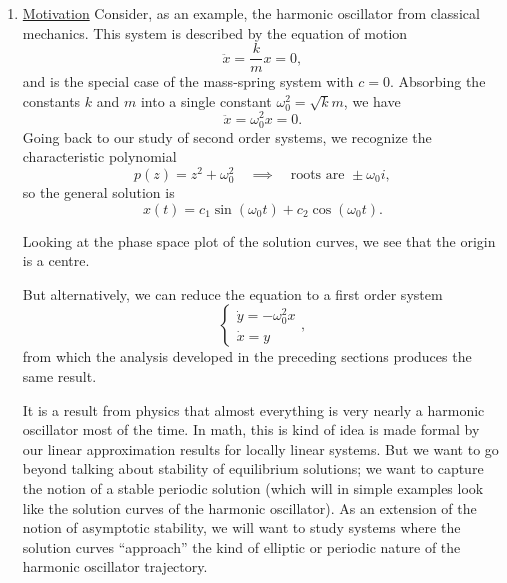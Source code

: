 \documentclass[11pt, letterpaper, oneside]{article}     %
\numberwithin{equation}{subsection}
\theoremstyle{definition}
\numberwithin{theorem}{section}
\theoremstyle{remark}
\begin{document}
\begin{enumerate}
\item \underline{Motivation} Consider, as an example, the harmonic oscillator from classical mechanics. This system is described by the equation of motion
  \begin{equation}
    \ddot x = \frac{k}{m}x = 0,
  \end{equation}
  and is the special case of the mass-spring system with $c = 0$. Absorbing the constants $k$ and $m$ into a single constant $\omega_0^2 = \sqrt{k}{m}$, we have
  \begin{equation}
    \ddot x = \omega_0^2x = 0.
  \end{equation}
  Going back to our study of second order systems, we recognize the characteristic polynomial
  \begin{equation}
    p(z) = z^2 + \omega_0^2 \quad\implies\quad
    \text{roots are }\pm\omega_0 i,
  \end{equation}
  so the general solution is
  \begin{equation}
    x(t) = c_1\sin(\omega_0 t) + c_2\cos(\omega_0 t).
  \end{equation}

  Looking at the phase space plot of the solution curves, we see that the origin is a centre.

  But alternatively, we can reduce the equation to a first order system
  \begin{equation}
    \begin{cases}
      \dot y = -\omega_0^2x\\
      \dot x = y
    \end{cases},
  \end{equation}
  from which the analysis developed in the preceding sections produces the same result.

  It is a result from physics that almost everything is very nearly a harmonic oscillator most of the time. In math, this is kind of idea is made formal by our linear approximation results for locally linear systems. But we want to go beyond talking about stability of equilibrium solutions; we want to capture the notion of a stable periodic solution (which will in simple examples look like the solution curves of the harmonic oscillator). As an extension of the notion of asymptotic stability, we will want to study systems where the solution curves ``approach'' the kind of elliptic or periodic nature of the harmonic oscillator trajectory.

  \medskip


\end{enumerate}
\end{document}

